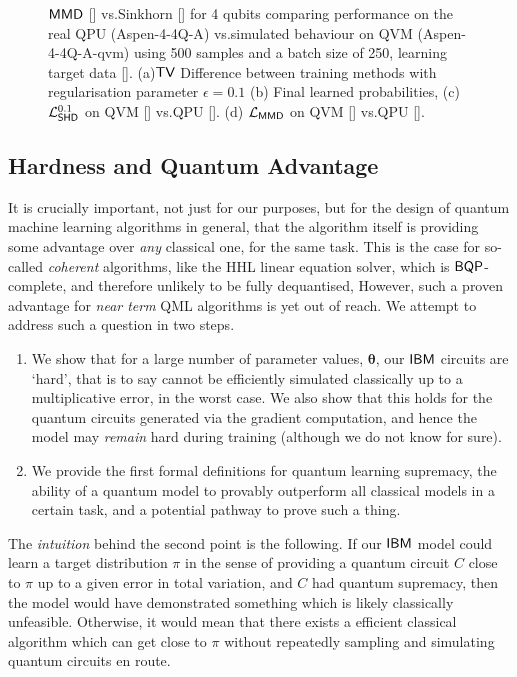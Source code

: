 \begin{figure}[ht]
    \caption{$\operatorname{\textsf{MMD}}$ [\crule[ForestGreen]{0.2cm}{0.2cm}] vs.\@ Sinkhorn [\crule[blue]{0.2cm}{0.2cm}] for 4 qubits comparing performance on the real QPU ({\selectfont Aspen-4-4Q-A}) vs.\@ simulated behaviour on QVM ({\selectfont Aspen-4-4Q-A-qvm}) using 500 samples and a batch size of 250, learning target data [\crule[black]{0.2cm}{0.2cm}]. (a)$\operatorname{\textsf{TV}}$ Difference between training methods with regularisation parameter $\epsilon = 0.1$ (b) Final learned probabilities, (c) $\mathcal{L}^{0.1}_{\operatorname{\textsf{SHD}}}$ on QVM  [\crule[blue]{0.2cm}{0.2cm}] vs.\@ QPU  [\crule[cyan]{0.2cm}{0.2cm}]. (d) $\mathcal{L}_{\operatorname{\textsf{MMD}}}$ on QVM  [\crule[ForestGreen]{0.2cm}{0.2cm}] vs.\@ QPU  [\crule[cyan]{0.2cm}{0.2cm}]. }\label{fig:MMDvSink4_real}
\end{figure}


\subsection*{Hardness and Quantum Advantage}
It is crucially important, not just for our purposes, but for the design of quantum machine learning algorithms in general, that the algorithm itself is providing some advantage over \textit{any} classical one, for the same task. This is the case for so-called \textit{coherent} algorithms, like the HHL linear equation solver\cite{harrow_quantum_2009}, which is $\textsf{BQP}$-complete, and therefore unlikely to be fully dequantised, 
However, such a proven advantage for \textit{near term} QML algorithms is yet out of reach. We attempt to address such a question in two steps. 
\begin{enumerate}
    \item We show that for a large number of parameter values, $\boldsymbol\theta$, our $\textsf{IBM}$ circuits are `hard', that is to say cannot be efficiently simulated classically up to a multiplicative error, in the worst case. We also show that this holds for the quantum circuits generated via the gradient computation, and hence the model may \textit{remain} hard during training (although we do not know for sure).
    \item We provide the first formal definitions for quantum learning supremacy, the ability of a quantum model to provably outperform all classical models in a certain task, and a potential pathway to prove such a thing.
\end{enumerate}

The \emph{intuition} behind the second point is the following. If our $\textsf{IBM}$ model could %
learn a target distribution $\pi$ in the sense of providing a quantum circuit $C$
close to $\pi$ up to a given error in total variation,
and $C$ had %
quantum supremacy, then the model would have demonstrated something which is likely classically unfeasible. Otherwise, it would mean that there exists a efficient classical algorithm 
which can get close to $\pi$ without repeatedly sampling and simulating quantum circuits 
en route.

